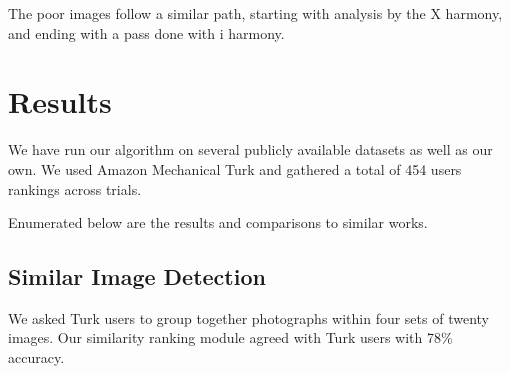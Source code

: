 \documentclass{article}
\begin{document}
The poor images follow a similar path, starting with analysis by the X harmony, and ending with a pass done with i harmony.

\section{Results}
We have run our algorithm on several publicly available datasets as well as our own. We used Amazon Mechanical Turk and gathered a total of 454 users rankings across trials.

Enumerated below are the results and comparisons to similar works.

\subsection{Similar Image Detection}
We asked Turk users to group together photographs within four sets of twenty images. Our similarity ranking module agreed with Turk users with 78\% accuracy.
\end{document}

